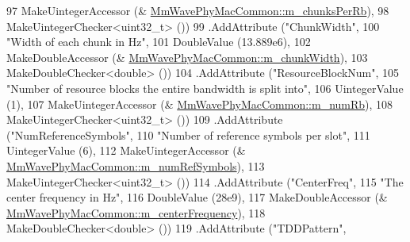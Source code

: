 \begin{DoxyCode}
97                                                    MakeUintegerAccessor (&
      \hyperlink{classns3_1_1MmWavePhyMacCommon_ae715e8c8b35d4844a8d608e65753451f}{MmWavePhyMacCommon::m\_chunksPerRb}),
98                                                    MakeUintegerChecker<uint32\_t> ())
99                         .AddAttribute (\textcolor{stringliteral}{"ChunkWidth"},
100                                                    \textcolor{stringliteral}{"Width of each chunk in Hz"},
101                                                    DoubleValue (13.889e6),
102                                                    MakeDoubleAccessor (&
      \hyperlink{classns3_1_1MmWavePhyMacCommon_a6eca13a16915823b63cf56fe11c48d31}{MmWavePhyMacCommon::m\_chunkWidth}),
103                                                    MakeDoubleChecker<double> ())
104                         .AddAttribute (\textcolor{stringliteral}{"ResourceBlockNum"},
105                                                    \textcolor{stringliteral}{"Number of resource blocks the entire bandwidth is split
       into"},
106                                                    UintegerValue (1),
107                                                    MakeUintegerAccessor (&
      \hyperlink{classns3_1_1MmWavePhyMacCommon_ae362333894bab75327f13bccd391a83c}{MmWavePhyMacCommon::m\_numRb}),
108                                                    MakeUintegerChecker<uint32\_t> ())
109                         .AddAttribute (\textcolor{stringliteral}{"NumReferenceSymbols"},
110                                                    \textcolor{stringliteral}{"Number of reference symbols per slot"},
111                                                    UintegerValue (6),
112                                                    MakeUintegerAccessor (&
      \hyperlink{classns3_1_1MmWavePhyMacCommon_ac17231d936d011081c0770e2c27a9681}{MmWavePhyMacCommon::m\_numRefSymbols}),
113                                                    MakeUintegerChecker<uint32\_t> ())
114                         .AddAttribute (\textcolor{stringliteral}{"CenterFreq"},
115                                                    \textcolor{stringliteral}{"The center frequency in Hz"},
116                                                    DoubleValue (28e9),
117                                                    MakeDoubleAccessor (&
      \hyperlink{classns3_1_1MmWavePhyMacCommon_a02d8d937a757a4acee4beb7a34aa1461}{MmWavePhyMacCommon::m\_centerFrequency}),
118                                                    MakeDoubleChecker<double> ())
119                         .AddAttribute (\textcolor{stringliteral}{"TDDPattern"},

\end{DoxyCode}
